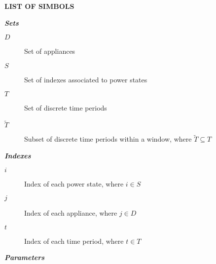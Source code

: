 \newpage

\begin{center}
  \large{\textbf{LIST OF SIMBOLS}}
\end{center}


\noindent \emph{\textbf{Sets}}


\vspace{4pt}

\begin{description}
    \item [{$D$}]           Set of appliances
    \item [{$S$}]           Set of indexes associated to power states
    \item [{$T$}]           Set of discrete time periods
    \item [{$\tilde{T}$}]   Subset of discrete time periods within a window, where $\tilde{T} \subseteq T$

\end{description}

\vspace{4pt}

\noindent \emph{\textbf{Indexes}}

\vspace{4pt}

\begin{description}
    \item [{$i$}]   Index of each power state, where $i \in S$
    \item [{$j$}]   Index of each appliance, where $j \in D$
    \item [{$t$}]   Index of each time period, where $t \in T$

\end{description}

\vspace{4pt}

\noindent \emph{\textbf{Parameters}}

\vspace{4pt}

